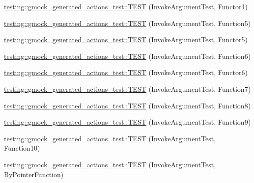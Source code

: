 \begin{DoxyCompactItemize}
\item 
\mbox{\hyperlink{namespacetesting_1_1gmock__generated__actions__test_a47d12c8e504971d1f1c17df8d90bff82}{testing\+::gmock\+\_\+generated\+\_\+actions\+\_\+test\+::\+T\+E\+ST}} (Invoke\+Argument\+Test, Functor1)
\item 
\mbox{\hyperlink{namespacetesting_1_1gmock__generated__actions__test_a6afe3cf31ef3f5a9d6fd6af05c9de95c}{testing\+::gmock\+\_\+generated\+\_\+actions\+\_\+test\+::\+T\+E\+ST}} (Invoke\+Argument\+Test, Function5)
\item 
\mbox{\hyperlink{namespacetesting_1_1gmock__generated__actions__test_aab59917791fb297d6735d46e9a862be1}{testing\+::gmock\+\_\+generated\+\_\+actions\+\_\+test\+::\+T\+E\+ST}} (Invoke\+Argument\+Test, Functor5)
\item 
\mbox{\hyperlink{namespacetesting_1_1gmock__generated__actions__test_ae3f8bdac5c2ea1cf56ff1484ebb9a44e}{testing\+::gmock\+\_\+generated\+\_\+actions\+\_\+test\+::\+T\+E\+ST}} (Invoke\+Argument\+Test, Function6)
\item 
\mbox{\hyperlink{namespacetesting_1_1gmock__generated__actions__test_a789c7e8ee88243dc4a53841f6a8da3c6}{testing\+::gmock\+\_\+generated\+\_\+actions\+\_\+test\+::\+T\+E\+ST}} (Invoke\+Argument\+Test, Functor6)
\item 
\mbox{\hyperlink{namespacetesting_1_1gmock__generated__actions__test_a3e13c2ccf384c80c66116418e1b3ccde}{testing\+::gmock\+\_\+generated\+\_\+actions\+\_\+test\+::\+T\+E\+ST}} (Invoke\+Argument\+Test, Function7)
\item 
\mbox{\hyperlink{namespacetesting_1_1gmock__generated__actions__test_a5d583a32b46a306139d32ea9a1d575a9}{testing\+::gmock\+\_\+generated\+\_\+actions\+\_\+test\+::\+T\+E\+ST}} (Invoke\+Argument\+Test, Function8)
\item 
\mbox{\hyperlink{namespacetesting_1_1gmock__generated__actions__test_a3a278f02e1633feda3dea30d810a49ea}{testing\+::gmock\+\_\+generated\+\_\+actions\+\_\+test\+::\+T\+E\+ST}} (Invoke\+Argument\+Test, Function9)
\item 
\mbox{\hyperlink{namespacetesting_1_1gmock__generated__actions__test_afe4653b181e199417b004c4485152010}{testing\+::gmock\+\_\+generated\+\_\+actions\+\_\+test\+::\+T\+E\+ST}} (Invoke\+Argument\+Test, Function10)
\item 
\mbox{\hyperlink{namespacetesting_1_1gmock__generated__actions__test_ac3ff9db96cb7a664ef44d20eb0a7a71f}{testing\+::gmock\+\_\+generated\+\_\+actions\+\_\+test\+::\+T\+E\+ST}} (Invoke\+Argument\+Test, By\+Pointer\+Function)
\item 

\end{DoxyCompactItemize}
